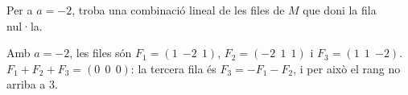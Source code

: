 \begin{apartats}
\begin{nomesllarg}
Per a $a=-2$, troba una combinació lineal de les files de $M$ que doni la fila nul·la.

\begin{solucio}
Amb $a=-2$, les files són $F_1=(1\ \ {-2}\ \ 1)$, $F_2=(-2\ \ 1\ \ 1)$ i $F_3=(1\ \ 1\ \ {-2})$.
$F_1+F_2+F_3=(0\ \ 0\ \ 0)$: la tercera fila és $F_3=-F_1-F_2$, i per això el rang no arriba a 3.
\end{solucio}
\end{nomesllarg}

\end{apartats}
